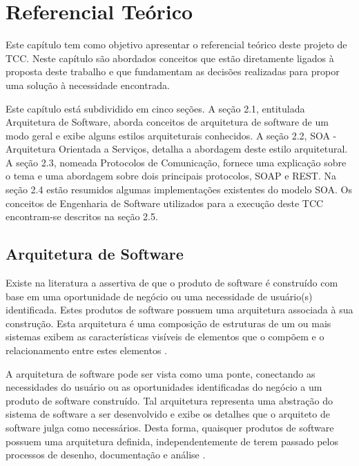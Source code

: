 \chapter[Referencial Teórico]{Referencial Teórico}

Este capítulo tem como objetivo apresentar o referencial teórico deste projeto de TCC. Neste capítulo são abordados conceitos que estão diretamente ligados à proposta deste trabalho e que fundamentam as decisões realizadas para propor uma solução à necessidade encontrada.

Este capítulo está subdividido em cinco seções. A seção 2.1, entitulada Arquitetura de Software, aborda conceitos de arquitetura de software de um modo geral e exibe alguns estilos arquiteturais conhecidos. A seção 2.2, SOA - Arquitetura Orientada a Serviços, detalha a abordagem deste estilo arquitetural. A seção 2.3, nomeada Protocolos de Comunicação, fornece uma explicação sobre o tema e uma abordagem sobre dois principais protocolos, SOAP e REST. Na seção 2.4 estão resumidos algumas implementações existentes do modelo SOA. Os conceitos de Engenharia de Software utilizados para a execução deste TCC encontram-se descritos na seção 2.5.

\section{Arquitetura de Software}
Existe na literatura a assertiva de que o produto de software é construído com base em uma oportunidade de negócio ou uma necessidade de usuário(s) identificada. Estes produtos de software possuem uma arquitetura associada à sua construção. Esta arquitetura é uma composição de estruturas de um ou mais sistemas exibem as características visíveis de elementos que o compõem e o relacionamento entre estes elementos \cite{bass_software_archi_practice_2003}.

A arquitetura de software pode ser vista como uma ponte, conectando as necessidades do usuário ou as oportunidades identificadas do negócio a um produto de software construído. Tal arquitetura representa uma abstração do sistema de software a ser desenvolvido e exibe os detalhes que o arquiteto de software julga como necessários. Desta forma, quaisquer produtos de software possuem uma arquitetura definida, independentemente de terem passado pelos processos de desenho, documentação e análise \cite{bass_software_archi_practice_2003}.

